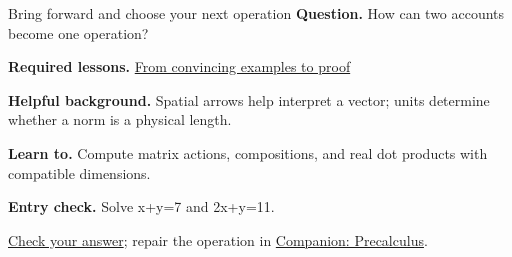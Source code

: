 \begin{learningcard}{Bring forward and choose your next operation}
\textsf{\textbf{Question.}} How can two accounts become one operation?\par
\textbf{Required lessons.} \hyperref[learn:proof]{From convincing examples to proof}\par
\textbf{Helpful background.} Spatial arrows help interpret a vector; units determine whether a norm is a physical length.\par
\textbf{Learn to.} Compute matrix actions, compositions, and real dot products with compatible dimensions.\par
\textbf{Entry check.} Solve x+y=7 and 2x+y=11.\par
\hyperref[solution:entry:matrix_maps]{Check your answer}; repair the operation in \href{https://github.com/Oichkatzelesfrettschen/precalc_paper}{Companion: Precalculus}.
\end{learningcard}
